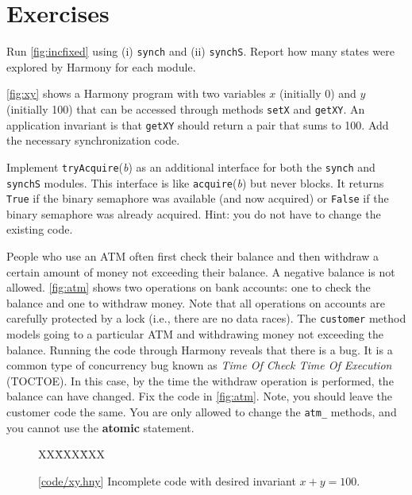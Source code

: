 \documentclass{report}
\newcommand{\harmonysource}[1]{
\begin{tabbing}
XX\=XXX\=XXX\kill
    
\end{tabbing}
}
\newcommand{\harmonylink}[1]{%
[\href{https://harmony.cs.cornell.edu/#1}{\underline{#1}}]%
}
\newenvironment{code}{
\tcolorbox
}{
\endtcolorbox
}
\begin{document}
\section*{Exercises}
\begin{problems}
\item
Run \autoref{fig:incfixed} using (i) \texttt{synch} and (ii) \texttt{synchS}.
Report how many states were explored by Harmony for each module.
\item \label{ex:xy} \autoref{fig:xy} shows a Harmony program with two variables $x$
(initially 0) and $y$ (initially 100) that can be accessed through methods
\texttt{setX} and \texttt{getXY}.  An application invariant is that \texttt{getXY}
should return a pair that sums to 100.  Add the necessary synchronization code.
\item \label{ex:trylock} Implement \texttt{tryAcquire}(\textit{b}) as an additional
interface for both the \texttt{synch} and \texttt{synchS} modules.
This interface is like \texttt{acquire}(\textit{b}) but never blocks.  It
returns \texttt{True} if the binary semaphore was available (and now acquired) or \texttt{False}
if the binary semaphore was already acquired.
Hint: you do not have to change the existing code.
\item People who use an ATM often first check their balance and then withdraw
a certain amount of money not exceeding their balance.  A negative balance
is not allowed.  \autoref{fig:atm} shows two operations on bank accounts:
one to check the balance and one to withdraw money.
Note that all operations on accounts are carefully protected by a lock
(i.e., there are no data races).
The \texttt{customer}
method models going to a particular ATM and withdrawing money not exceeding
the balance.
Running the code through Harmony reveals that there is a bug.
It is a common type of concurrency bug known as \emph{Time Of Check Time Of
Execution} (TOCTOE).
In this case, by the time the withdraw operation is performed,
the balance can have changed.
Fix the code in \autoref{fig:atm}.  Note, you should leave the
customer code the same. You are only allowed to change the
\texttt{atm\_} methods, and you cannot use the \textbf{atomic}
statement.
\end{problems}

\begin{figure}
\begin{code}
\harmonysource{xy}
\end{code}
\caption{\harmonylink{code/xy.hny} Incomplete code with desired invariant $x + y = 100$.}
\label{fig:xy}
\end{figure}
\end{document}
